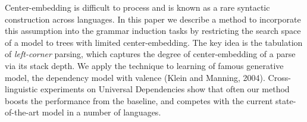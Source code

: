 Center-embedding is difficult to process and is known as a rare syntactic construction across languages. In this paper we describe a method to incorporate this assumption into the grammar induction tasks by restricting the search space of a model to trees with limited center-embedding. The key idea is the tabulation of {\it left-corner} parsing, which captures the degree of center-embedding of a parse via its stack depth. We apply the technique to learning of famous generative model, the dependency model with valence (Klein and Manning, 2004). Cross-linguistic experiments on Universal Dependencies show that often our method boosts the performance from the baseline, and competes with the current state-of-the-art model in a number of languages.
